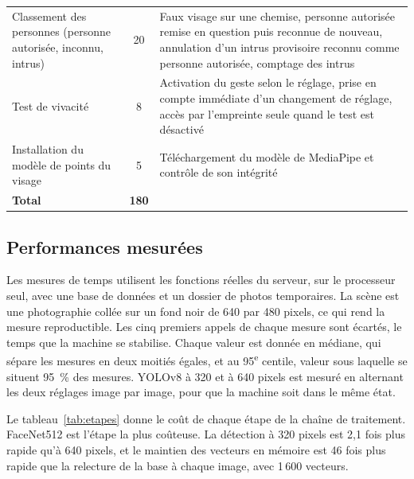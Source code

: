 \begin{table}[H]
\begin{tabularx}{\textwidth}{@{}>{\raggedright\arraybackslash}p{3.9cm}c>{\raggedright\arraybackslash}X@{}}
Classement des personnes (personne autorisée, inconnu, intrus) & 20 & Faux visage sur une chemise, personne autorisée remise en question puis reconnue de nouveau, annulation d'un intrus provisoire reconnu comme personne autorisée, comptage des intrus \\
Test de vivacité & 8 & Activation du geste selon le réglage, prise en compte immédiate d'un changement de réglage, accès par l'empreinte seule quand le test est désactivé \\
Installation du modèle de points du visage & 5 & Téléchargement du modèle de MediaPipe et contrôle de son intégrité \\
\midrule
\textbf{Total} & \textbf{180} & \\
\bottomrule
\end{tabularx}
\end{table}

\subsection{Performances mesurées}\label{sec:perf}

\begin{maj}
Les mesures de temps utilisent les fonctions réelles du serveur, sur le processeur seul, avec une base de données et un dossier de photos temporaires. La scène est une photographie collée sur un fond noir de 640 par 480 pixels, ce qui rend la mesure reproductible. Les cinq premiers appels de chaque mesure sont écartés, le temps que la machine se stabilise. Chaque valeur est donnée en médiane, qui sépare les mesures en deux moitiés égales, et au 95\textsuperscript{e} centile, valeur sous laquelle se situent 95~\% des mesures. YOLOv8 à 320 et à 640 pixels est mesuré en alternant les deux réglages image par image, pour que la machine soit dans le même état.

Le tableau~\ref{tab:etapes} donne le coût de chaque étape de la chaîne de traitement. FaceNet512 est l'étape la plus coûteuse. La détection à 320 pixels est 2,1 fois plus rapide qu'à 640 pixels, et le maintien des vecteurs en mémoire est 46 fois plus rapide que la relecture de la base à chaque image, avec 1\,600 vecteurs.
\end{maj}

